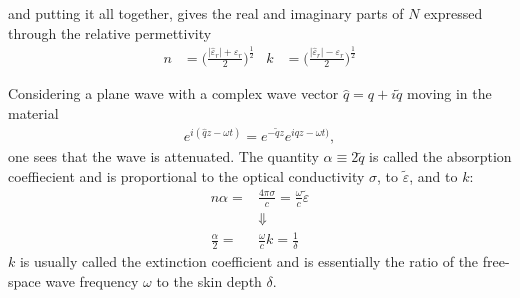 and putting it all together, gives the real and imaginary parts of $N$ expressed through the 
relative permettivity
\begin{align}
   n      &= \Bigg( \frac{\big|\widehat\varepsilon_r\big| + \varepsilon_r}{2}           \Bigg)^{\frac{1}{2}} 
  &k &=      \Bigg( \frac{\big|\widehat\varepsilon_r\big| - \varepsilon_r}{2}           \Bigg)^{\frac{1}{2}} 
\end{align}

Considering a plane wave with a complex wave vector $\widehat q = q + i \tilde q$ moving in the material
\cite[p.~402]{Griffiths}
\begin{align}
  e^{i(\widehat q z - \omega t )} 
  = e^{-\tilde q z} e^{i q z - \omega t )} ,
\end{align}
one sees that the wave is attenuated. 
The quantity $\alpha \equiv 2 \tilde q$ is called the absorption coeffiecient
and is proportional to the optical conductivity $\sigma$, to $\tilde\varepsilon$, and to $k$:
\begin{align}
   n\alpha = &\frac{4 \pi \sigma}{c} = \frac{\omega}{c} \tilde\varepsilon\\
                     &\Downarrow \\
   \frac{\alpha}{2} = &\frac{\omega}{c}k = \frac{1}{\delta}
\end{align}
$k$ is usually called the extinction coefficient and is essentially the ratio of the
free-space wave frequency $\omega$ to the skin depth $\delta$.\\


